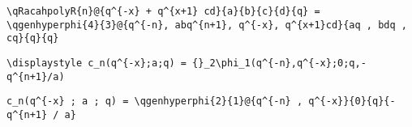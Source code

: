 \newsavebox\CKST
\begin{lrbox}{\CKST}
 \begin{minipage}[t]{0.82\textwidth}
  \lstinline[language={[latex]TeX},mathescape,breaklines=true]"\qRacahpolyR{n}@{q^{-x} + q^{x+1} cd}{a}{b}{c}{d}{q} = \qgenhyperphi{4}{3}@{q^{-n}, abq^{n+1}, q^{-x}, q^{x+1}cd}{aq , bdq , cq}{q}{q}"
 \end{minipage}
\end{lrbox}
\newsavebox\CKMM
\begin{lrbox}{\CKMM}
 \begin{minipage}[t]{0.82\textwidth}
  \lstinline[language={[latex]TeX},mathescape,breaklines=true]""
 \end{minipage}
\end{lrbox}
\newsavebox\CKMA
\begin{lrbox}{\CKMA}
 \begin{minipage}[t]{0.82\textwidth}
  \lstinline[language={[latex]TeX},mathescape,breaklines=true]""
 \end{minipage}
\end{lrbox}
\newsavebox\CLT
\begin{lrbox}{\CLT}
 \begin{minipage}[t]{0.82\textwidth}
  \lstinline[language={[latex]TeX},mathescape,breaklines=true]"\displaystyle c_n(q^{-x};a;q) = {}_2\phi_1(q^{-n},q^{-x};0;q,-q^{n+1}/a)"
 \end{minipage}
\end{lrbox}
\newsavebox\CLST
\begin{lrbox}{\CLST}
 \begin{minipage}[t]{0.82\textwidth}
  \lstinline[language={[latex]TeX},mathescape,breaklines=true]"c_n(q^{-x} ; a ; q) = \qgenhyperphi{2}{1}@{q^{-n} , q^{-x}}{0}{q}{- q^{n+1} / a}"
 \end{minipage}
\end{lrbox}
\newsavebox\CLMM
\begin{lrbox}{\CLMM}
 \begin{minipage}[t]{0.82\textwidth}
  \lstinline[language={[latex]TeX},mathescape,breaklines=true]""
 \end{minipage}
\end{lrbox}
\newsavebox\CLMA
\begin{lrbox}{\CLMA}
 \begin{minipage}[t]{0.82\textwidth}
  \lstinline[language={[latex]TeX},mathescape,breaklines=true]""
 \end{minipage}
\end{lrbox}
